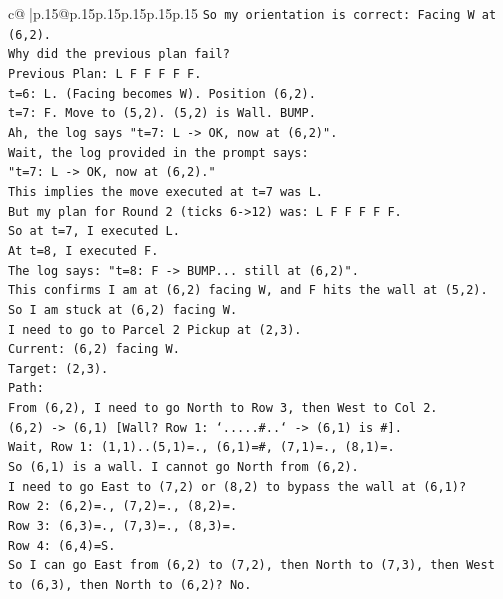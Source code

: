 \documentclass{article}
\begin{document}
{\begin{supertabular}{c@{$\;$}|p{.15\linewidth}@{}p{.15\linewidth}p{.15\linewidth}p{.15\linewidth}p{.15\linewidth}p{.15\linewidth}}
{{{\texttt{So my orientation is correct: Facing W at (6,2).} \\
\texttt{Why did the previous plan fail?} \\
\texttt{Previous Plan: L F F F F F.} \\
\texttt{t=6: L. (Facing becomes W). Position (6,2).} \\
\texttt{t=7: F. Move to (5,2). (5,2) is Wall. BUMP.} \\
\texttt{Ah, the log says "t=7: L {-}> OK, now at (6,2)".} \\
\texttt{Wait, the log provided in the prompt says:} \\
\texttt{"t=7: L {-}> OK, now at (6,2)."} \\
\texttt{This implies the move executed at t=7 was L.} \\
\texttt{But my plan for Round 2 (ticks 6{-}>12) was: L F F F F F.} \\
\texttt{So at t=7, I executed L.} \\
\texttt{At t=8, I executed F.} \\
\texttt{The log says: "t=8: F {-}> BUMP... still at (6,2)".} \\
\texttt{This confirms I am at (6,2) facing W, and F hits the wall at (5,2).} \\
\texttt{So I am stuck at (6,2) facing W.} \\
\texttt{I need to go to Parcel 2 Pickup at (2,3).} \\
\texttt{Current: (6,2) facing W.} \\
\texttt{Target: (2,3).} \\
\texttt{Path:} \\
\texttt{From (6,2), I need to go North to Row 3, then West to Col 2.} \\
\texttt{(6,2) {-}> (6,1) {[}Wall? Row 1: `.....\#..` {-}> (6,1) is \#{]}.} \\
\texttt{Wait, Row 1: (1,1)..(5,1)=., (6,1)=\#, (7,1)=., (8,1)=.} \\
\texttt{So (6,1) is a wall. I cannot go North from (6,2).} \\
\texttt{I need to go East to (7,2) or (8,2) to bypass the wall at (6,1)?} \\
\texttt{Row 2: (6,2)=., (7,2)=., (8,2)=.} \\
\texttt{Row 3: (6,3)=., (7,3)=., (8,3)=.} \\
\texttt{Row 4: (6,4)=S.} \\
\texttt{So I can go East from (6,2) to (7,2), then North to (7,3), then West to (6,3), then North to (6,2)? No.} \\
}}}
\end{supertabular}}
\end{document}
